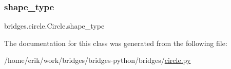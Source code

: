 \mbox{\label{classbridges_1_1circle_1_1_circle_a34d318970485d12445ce43225b81428e}} 
\subsubsection{\texorpdfstring{shape\+\_\+type}{shape\_type}}
{\footnotesize\ttfamily bridges.\+circle.\+Circle.\+shape\+\_\+type}



The documentation for this class was generated from the following file\+:\begin{DoxyCompactItemize}
\item 
/home/erik/work/bridges/bridges-\/python/bridges/\hyperlink{circle_8py}{circle.\+py}\end{DoxyCompactItemize}
